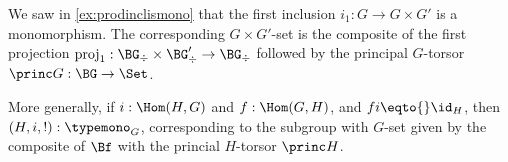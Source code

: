 \begin{example}
  \label{ex:prodinclisGset}
  We saw in \cref{ex:prodinclismono} that the first inclusion $i_1:G\to G\times G'$ is a monomorphism.
  The corresponding $G\times G'$-set is the composite of the first projection $\mathrm{proj}_1:\BG_\div\times\BG'_\div\to \BG_\div$ followed by the principal $G$-torsor $\princ G:\BG\to\Set$.

  More generally, if $i:\Hom(H,G)$ and $f:\Hom(G,H)$, and $fi\eqto{}\id_H$, then $(H,i,!):\typemono_G$, corresponding to the subgroup with $G$-set given by the composite of $\Bf$ with the princial $H$-torsor $\princ H$.
\end{example}








